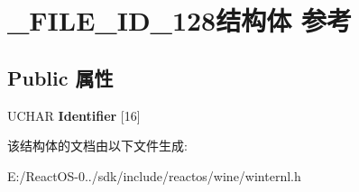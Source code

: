 \hypertarget{struct___f_i_l_e___i_d__128}{}\section{\+\_\+\+F\+I\+L\+E\+\_\+\+I\+D\+\_\+128结构体 参考}
\label{struct___f_i_l_e___i_d__128}
\subsection*{Public 属性}
\begin{DoxyCompactItemize}
\item 
\mbox{\label{struct___f_i_l_e___i_d__128_aec4e8f4131a41a8600d536eaf407ad8a}} 
U\+C\+H\+AR {\bfseries Identifier} \mbox{[}16\mbox{]}
\end{DoxyCompactItemize}


该结构体的文档由以下文件生成\+:\begin{DoxyCompactItemize}
\item 
E\+:/\+React\+O\+S-\/0../sdk/include/reactos/wine/winternl.\+h\end{DoxyCompactItemize}
